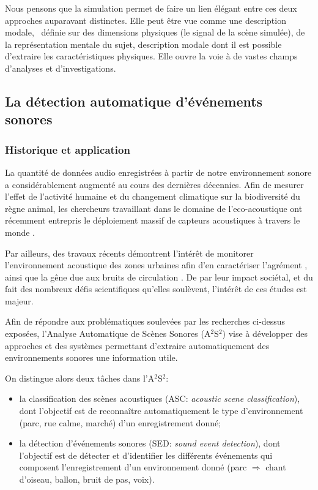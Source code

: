 Nous pensons que la simulation permet de faire un lien élégant entre ces deux approches auparavant distinctes. Elle peut être vue comme une description modale, \ie~définie sur des dimensions physiques (le signal de la scène simulée), de la représentation mentale du sujet, description modale dont il est possible d'extraire les caractéristiques physiques. Elle ouvre la voie à de vastes champs d'analyses et d'investigations.


\subsection{La détection automatique d'événements sonores}
\label{ch1_SED}

\subsubsection{Historique et application}

La quantité de données audio enregistrées à partir de notre environnement sonore a considérablement augmenté au cours des dernières décennies. Afin de mesurer l'effet de l'activité humaine et du changement climatique sur la biodiversité du règne animal, les chercheurs travaillant dans le domaine de l'eco-acoustique \citep{ecoacoustic2014,krause} ont récemment entrepris le déploiement massif de capteurs acoustiques à travers le monde \citep{warren2006urban,nessSST13,stowell13a,stowell13b}.

Par ailleurs, des travaux récents démontrent l'intérêt de monitorer l'environnement acoustique des zones urbaines afin d'en caractériser l'agrément  \citep{guyot2005urban,ricciardi2015sound}, ainsi que la gêne due aux bruits de circulation \citep{gloaguen2016}. De par leur impact sociétal, et du fait des nombreux défis scientifiques qu'elles soulèvent, l'intérêt de ces études est majeur.

Afin de répondre aux problématiques soulevées par les recherches ci-dessus exposées, l'Analyse Automatique de Scènes Sonores (A$^2$S$^2$) \citep{Stowell15} vise à développer des approches et des systèmes permettant d'extraire automatiquement des environnements sonores une information utile.

On distingue alors deux tâches dans l'A$^2$S$^2$:

\begin{itemize}
\item la classification des scènes acoustiques (ASC: \emph{acoustic scene classification}), dont l'objectif est de reconnaître automatiquement le type d'environnement (parc, rue calme, marché) d'un enregistrement donné;
\item la détection d'événements sonores (SED: \emph{sound event detection}), dont l'objectif est de détecter et d'identifier les différents événements qui composent l'enregistrement d'un environnement donné (parc $\Rightarrow$ chant d'oiseau, ballon, bruit de pas, voix).
\end{itemize}

